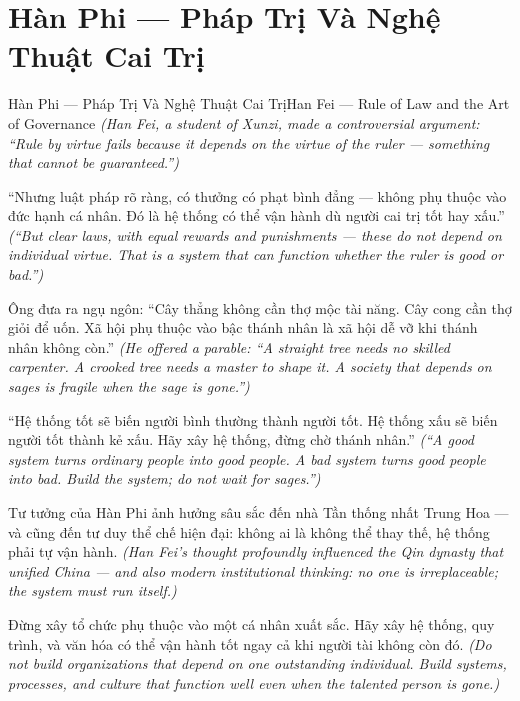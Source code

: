 \section{Hàn Phi — Pháp Trị Và Nghệ Thuật Cai Trị}
\begin{truyen}{Hàn Phi — Pháp Trị Và Nghệ Thuật Cai Trị}{Han Fei — Rule of Law and the Art of Governance}
\textit{(Han Fei, a student of Xunzi, made a controversial argument: ``Rule by virtue fails because it depends on the virtue of the ruler — something that cannot be guaranteed.'')}

``Nhưng luật pháp rõ ràng, có thưởng có phạt bình đẳng — không phụ thuộc vào đức hạnh cá nhân. Đó là hệ thống có thể vận hành dù người cai trị tốt hay xấu.''
\textit{(``But clear laws, with equal rewards and punishments — these do not depend on individual virtue. That is a system that can function whether the ruler is good or bad.'')}

Ông đưa ra ngụ ngôn: ``Cây thẳng không cần thợ mộc tài năng. Cây cong cần thợ giỏi để uốn. Xã hội phụ thuộc vào bậc thánh nhân là xã hội dễ vỡ khi thánh nhân không còn.''
\textit{(He offered a parable: ``A straight tree needs no skilled carpenter. A crooked tree needs a master to shape it. A society that depends on sages is fragile when the sage is gone.'')}

``Hệ thống tốt sẽ biến người bình thường thành người tốt. Hệ thống xấu sẽ biến người tốt thành kẻ xấu. Hãy xây hệ thống, đừng chờ thánh nhân.''
\textit{(``A good system turns ordinary people into good people. A bad system turns good people into bad. Build the system; do not wait for sages.'')}

Tư tưởng của Hàn Phi ảnh hưởng sâu sắc đến nhà Tần thống nhất Trung Hoa — và cũng đến tư duy thể chế hiện đại: không ai là không thể thay thế, hệ thống phải tự vận hành.
\textit{(Han Fei's thought profoundly influenced the Qin dynasty that unified China — and also modern institutional thinking: no one is irreplaceable; the system must run itself.)}

\end{truyen}

\begin{baihoc}
Đừng xây tổ chức phụ thuộc vào một cá nhân xuất sắc. Hãy xây hệ thống, quy trình, và văn hóa có thể vận hành tốt ngay cả khi người tài không còn đó.
\textit{(Do not build organizations that depend on one outstanding individual. Build systems, processes, and culture that function well even when the talented person is gone.)}
\end{baihoc}
\ngancach

